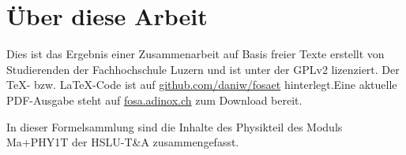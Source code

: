 



\chapter*{Über diese Arbeit}
Dies ist das Ergebnis einer Zusammenarbeit auf Basis freier Texte erstellt von Studierenden der Fachhochschule Luzern und ist unter der GPLv2 lizenziert. Der \TeX - bzw. \LaTeX -Code ist auf \url{github.com/daniw/fosaet} hinterlegt.Eine aktuelle PDF-Ausgabe steht auf \url{fosa.adinox.ch} zum Download bereit.

In dieser Formelsammlung sind die Inhalte des Physikteil des Moduls Ma+PHY1T der HSLU-T\&A zusammengefasst. 
